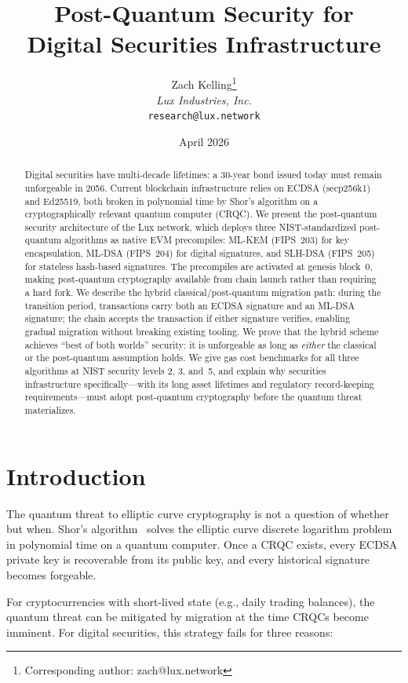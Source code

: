 \documentclass[11pt,a4paper]{article}
\title{Post-Quantum Security for\\Digital Securities Infrastructure}
\author{
Zach Kelling\thanks{Corresponding author: zach@lux.network}\\
\textit{Lux Industries, Inc.}\\
\texttt{research@lux.network}
}
\date{April 2026}
\begin{document}
\luxcoverpage

\begin{abstract}
Digital securities have multi-decade lifetimes: a 30-year bond issued
today must remain unforgeable in 2056.  Current blockchain infrastructure
relies on ECDSA (secp256k1) and Ed25519, both broken in polynomial time
by Shor's algorithm on a cryptographically relevant quantum computer
(CRQC).  We present the post-quantum security architecture of the Lux
network, which deploys three NIST-standardized post-quantum algorithms
as native EVM precompiles: ML-KEM (FIPS~203) for key encapsulation,
ML-DSA (FIPS~204) for digital signatures, and SLH-DSA (FIPS~205) for
stateless hash-based signatures.  The precompiles are activated at
genesis block~0, making post-quantum cryptography available from chain
launch rather than requiring a hard fork.  We describe the hybrid
classical/post-quantum migration path: during the transition period,
transactions carry both an ECDSA signature and an ML-DSA signature;
the chain accepts the transaction if either signature verifies,
enabling gradual migration without breaking existing tooling.  We prove
that the hybrid scheme achieves ``best of both worlds'' security:
it is unforgeable as long as \emph{either} the classical or the
post-quantum assumption holds.  We give gas cost benchmarks for all
three algorithms at NIST security levels 2, 3, and~5, and explain
why securities infrastructure specifically---with its long asset
lifetimes and regulatory record-keeping requirements---must adopt
post-quantum cryptography before the quantum threat materializes.
\end{abstract}

\tableofcontents
\newpage

\section{Introduction}
\label{sec:intro}

The quantum threat to elliptic curve cryptography is not a question of
whether but when.  Shor's algorithm~\cite{shor1994} solves the elliptic
curve discrete logarithm problem in polynomial time on a quantum
computer.  Once a CRQC exists, every ECDSA private key is recoverable
from its public key, and every historical signature becomes forgeable.

For cryptocurrencies with short-lived state (e.g., daily trading
balances), the quantum threat can be mitigated by migration at the
time CRQCs become imminent.  For digital securities, this strategy
fails for three reasons:
\end{document}
